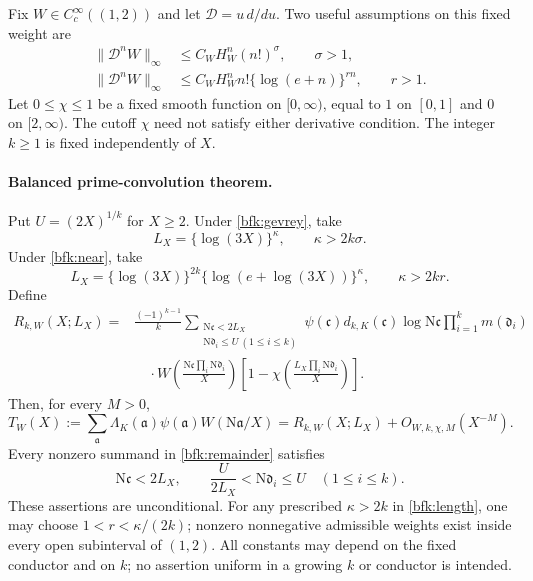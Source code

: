 Fix \(W\in C_c^\infty((1,2))\) and let
\(\mathcal D=u\,d/du\).
Two useful assumptions on this fixed weight are
\begin{align}
 \|\mathcal D^nW\|_\infty
  &\le C_WH_W^n(n!)^\sigma,\qquad \sigma>1,
  \label{bfk:gevrey}\\
 \|\mathcal D^nW\|_\infty
  &\le C_WH_W^n n!\{\log(e+n)\}^{rn},\qquad r>1.
  \label{bfk:near}
\end{align}
Let \(0\le\chi\le1\) be a fixed smooth function on \([0,\infty)\),
equal to \(1\) on \([0,1]\) and \(0\) on \([2,\infty)\).
The cutoff \(\chi\) need not satisfy either derivative condition.
The integer \(k\ge1\) is fixed independently of \(X\).

\paragraph{Balanced prime-convolution theorem.}
Put \(U=(2X)^{1/k}\) for \(X\ge2\).  Under
\eqref{bfk:gevrey}, take
\[
 L_X=\{\log(3X)\}^{\kappa},\qquad \kappa>2k\sigma.
\]
Under \eqref{bfk:near}, take
\begin{equation}
 L_X=\{\log(3X)\}^{2k}
       \{\log(e+\log(3X))\}^{\kappa},
 \qquad \kappa>2kr.
 \label{bfk:length}
\end{equation}
Define
\begin{equation}
\begin{split}
 R_{k,W}(X;L_X)
 ={}&\frac{(-1)^{k-1}}{k}
 \sum_{\substack{\mathrm N\mathfrak c<2L_X\\
                 \mathrm N\mathfrak d_i\le U\ (1\le i\le k)}}
 \psi(\mathfrak c)d_{k,K}(\mathfrak c)\log\mathrm N\mathfrak c
       \prod_{i=1}^k m(\mathfrak d_i)\\
 &\quad{}\cdot
 W\left(\frac{\mathrm N\mathfrak c
                  \prod_i\mathrm N\mathfrak d_i}{X}\right)
 \left[1-\chi\left(\frac{L_X\prod_i\mathrm N\mathfrak d_i}{X}\right)\right].
\end{split}
\label{bfk:remainder}
\end{equation}
Then, for every \(M>0\),
\begin{equation}
 T_W(X):=
 \sum_{\mathfrak a}\Lambda_K(\mathfrak a)\psi(\mathfrak a)
                    W(\mathrm N\mathfrak a/X)
 =R_{k,W}(X;L_X)+O_{W,k,\chi,M}(X^{-M}).
 \label{bfk:main}
\end{equation}
Every nonzero summand in \eqref{bfk:remainder} satisfies
\begin{equation}
 \mathrm N\mathfrak c<2L_X,\qquad
 \frac{U}{2L_X}<\mathrm N\mathfrak d_i\le U
 \quad(1\le i\le k).
 \label{bfk:balance}
\end{equation}
These assertions are unconditional.  For any prescribed
\(\kappa>2k\) in \eqref{bfk:length}, one may choose
\(1<r<\kappa/(2k)\); nonzero nonnegative admissible weights exist
inside every open subinterval of \((1,2)\).
All constants may depend on the fixed conductor and on \(k\);
no assertion uniform in a growing \(k\) or conductor is intended.

